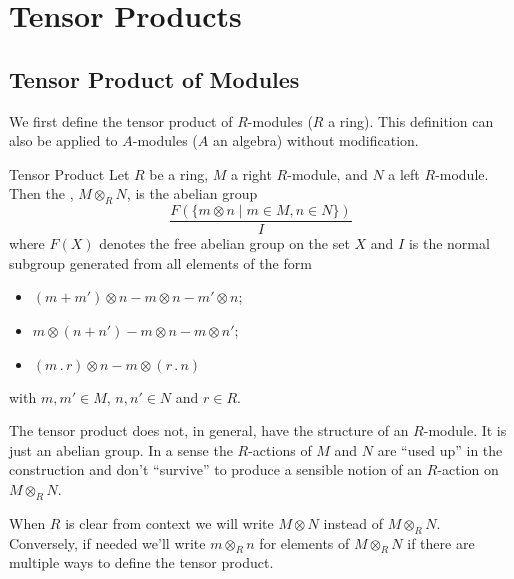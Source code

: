\documentclass[fleqn]{NotesClass}
\newcommand{\action}{\mathbin{.}}
\begin{document}
    \chapter{Tensor Products}
    \section{Tensor Product of Modules}
    We first define the tensor product of \(R\)-modules (\(R\) a ring). 
    This definition can also be applied to \(A\)-modules (\(A\) an algebra) without modification.
    
    \begin{dfn}{Tensor Product}{}
        Let \(R\) be a ring, \(M\) a right \(R\)-module, and \(N\) a left \(R\)-module.
        Then the , \(M \otimes_R N\), is the abelian group \begin{equation}
            \frac{F(\{m \otimes n \mid m \in M, n \in N\})}{I}
        \end{equation}
        where \(F(X)\) denotes the free abelian group on the set \(X\) and \(I\) is the normal subgroup generated from all elements of the form
        \begin{itemize}
            \item \((m + m') \otimes n - m \otimes n - m' \otimes n\);
            \item \(m \otimes (n + n') - m \otimes n - m \otimes n'\);
            \item \((m \action r) \otimes n - m \otimes (r \action n)\)
        \end{itemize}
        with \(m, m' \in M\), \(n, n' \in N\) and \(r \in R\).
    \end{dfn}
    
    \begin{wrn}
        The tensor product does not, in general, have the structure of an \(R\)-module.
        It is just an abelian group.
        In a sense the \(R\)-actions of \(M\) and \(N\) are \enquote{used up} in the construction and don't \enquote{survive} to produce a sensible notion of an \(R\)-action on \(M \otimes_R N\).
    \end{wrn}
    
    \begin{ntn}{}{}
        When \(R\) is clear from context we will write \(M \otimes N\) instead of \(M \otimes_R N\).
        Conversely, if needed we'll write \(m \otimes_R n\) for elements of \(M \otimes_R N\) if there are multiple ways to define the tensor product.
    \end{ntn}
    
\end{document}
